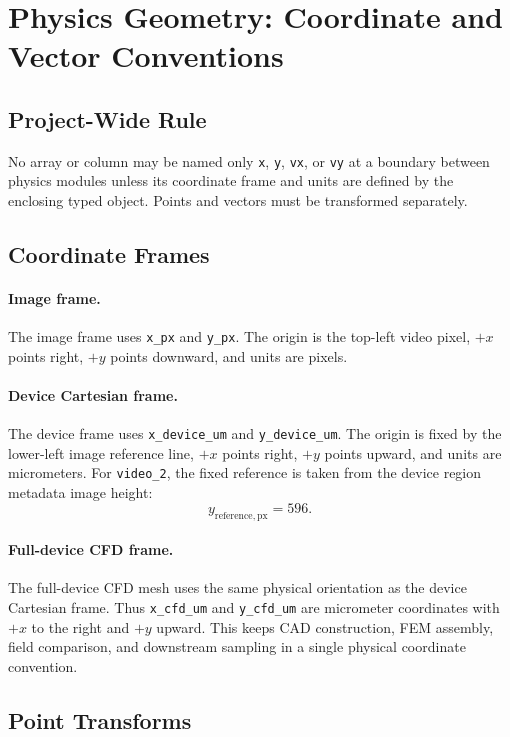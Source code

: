 \section{Physics Geometry: Coordinate and Vector Conventions}

\subsection{Project-Wide Rule}

No array or column may be named only \texttt{x}, \texttt{y}, \texttt{vx}, or
\texttt{vy} at a boundary between physics modules unless its coordinate frame
and units are defined by the enclosing typed object. Points and vectors must be
transformed separately.

\subsection{Coordinate Frames}

\paragraph{Image frame.}
The image frame uses \texttt{x\_px} and \texttt{y\_px}. The origin is the
top-left video pixel, \(+x\) points right, \(+y\) points downward, and units are
pixels.

\paragraph{Device Cartesian frame.}
The device frame uses \texttt{x\_device\_um} and \texttt{y\_device\_um}. The
origin is fixed by the lower-left image reference line, \(+x\) points right,
\(+y\) points upward, and units are micrometers. For \texttt{video\_2}, the
fixed reference is taken from the device region metadata image height:
\[
  y_{\mathrm{reference,px}} = 596.
\]

\paragraph{Full-device CFD frame.}
The full-device CFD mesh uses the same physical orientation as the device
Cartesian frame.  Thus \texttt{x\_cfd\_um} and \texttt{y\_cfd\_um} are
micrometer coordinates with \(+x\) to the right and \(+y\) upward.  This keeps
CAD construction, FEM assembly, field comparison, and downstream sampling in a
single physical coordinate convention.

\subsection{Point Transforms}

